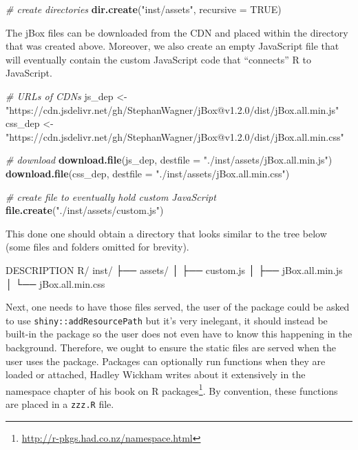 \documentclass[
]{krantz}
\makeatletter
\newenvironment{Shaded}{\begin{snugshade}}{\end{snugshade}}
\newcommand{\CommentTok}[1]{\textcolor[rgb]{0.37,0.37,0.37}{\textit{#1}}}
\newcommand{\DataTypeTok}[1]{\textcolor[rgb]{0.27,0.27,0.27}{#1}}
\newcommand{\ExtensionTok}[1]{#1}
\newcommand{\KeywordTok}[1]{\textcolor[rgb]{0.27,0.27,0.27}{\textbf{#1}}}
\newcommand{\NormalTok}[1]{#1}
\newcommand{\OtherTok}[1]{\textcolor[rgb]{0.37,0.37,0.37}{#1}}
\newcommand{\StringTok}[1]{\textcolor[rgb]{0.5,0.5,0.5}{#1}}
\renewcommand{\href}[2]{#2\footnote{\url{#1}}}
\newenvironment{kframe}{%
\medskip{}
\setlength{\fboxsep}{.8em}
 \def\at@end@of@kframe{}%
 \ifinner\ifhmode%
  \def\at@end@of@kframe{\end{minipage}}%
  \begin{minipage}{\columnwidth}%
 \fi\fi%
 \def\FrameCommand##1{\hskip\@totalleftmargin \hskip-\fboxsep
 \colorbox{shadecolor}{##1}\hskip-\fboxsep
     \hskip-\linewidth \hskip-\@totalleftmargin \hskip\columnwidth}%
 \MakeFramed {\advance\hsize-\width
   \@totalleftmargin\z@ \linewidth\hsize
   \@setminipage}}%
 {\par\unskip\endMakeFramed%
 \at@end@of@kframe}
\renewenvironment{Shaded}{\begin{kframe}}{\end{kframe}}
\makeatother
\begin{document}
\begin{Shaded}
\begin{Highlighting}[]
\CommentTok{\# create directories}
\KeywordTok{dir.create}\NormalTok{(}\StringTok{"inst/assets"}\NormalTok{, }\DataTypeTok{recursive =} \OtherTok{TRUE}\NormalTok{)}
\end{Highlighting}
\end{Shaded}

The jBox files can be downloaded from the CDN and placed within the directory that was created above. Moreover, we also create an empty JavaScript file that will eventually contain the custom JavaScript code that ``connects'' R to JavaScript.

\begin{Shaded}
\begin{Highlighting}[]
\CommentTok{\# URLs of CDNs}
\NormalTok{js\_dep \textless{}{-}}\StringTok{ "https://cdn.jsdelivr.net/gh/StephanWagner/jBox@v1.2.0/dist/jBox.all.min.js"}
\NormalTok{css\_dep \textless{}{-}}\StringTok{ "https://cdn.jsdelivr.net/gh/StephanWagner/jBox@v1.2.0/dist/jBox.all.min.css"}

\CommentTok{\# download}
\KeywordTok{download.file}\NormalTok{(js\_dep, }\DataTypeTok{destfile =} \StringTok{"./inst/assets/jBox.all.min.js"}\NormalTok{)}
\KeywordTok{download.file}\NormalTok{(css\_dep, }\DataTypeTok{destfile =} \StringTok{"./inst/assets/jBox.all.min.css"}\NormalTok{)}

\CommentTok{\# create file to eventually hold custom JavaScript}
\KeywordTok{file.create}\NormalTok{(}\StringTok{"./inst/assets/custom.js"}\NormalTok{)}
\end{Highlighting}
\end{Shaded}

This done one should obtain a directory that looks similar to the tree below (some files and folders omitted for brevity).

\begin{Shaded}
\begin{Highlighting}[]
\ExtensionTok{DESCRIPTION}
\ExtensionTok{R/}
\ExtensionTok{inst/}
\NormalTok{├── }\ExtensionTok{assets/}
\NormalTok{│    ├── }\ExtensionTok{custom.js}
\NormalTok{│    ├── }\ExtensionTok{jBox.all.min.js}
\NormalTok{│    └── }\ExtensionTok{jBox.all.min.css}
\end{Highlighting}
\end{Shaded}

Next, one needs to have those files served, the user of the package could be asked to use \texttt{shiny::addResourcePath} but it's very inelegant, it should instead be built-in the package so the user does not even have to know this happening in the background. Therefore, we ought to ensure the static files are served when the user uses the package. Packages can optionally run functions when they are loaded or attached, Hadley Wickham writes about it extensively in the namespace chapter of his book on \href{http://r-pkgs.had.co.nz/namespace.html}{R packages}. By convention, these functions are placed in a \texttt{zzz.R} file.
\end{document}
